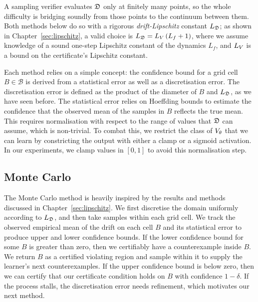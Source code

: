 A sampling verifier evaluates $\mathfrak{D}$ only at finitely many points, so the
whole difficulty is bridging soundly from those points to the continuum between
them. Both methods below do so with a rigorous \emph{drift-Lipschitz} constant
$L_{\mathfrak{D}}$; as shown in Chapter~\ref{sec:lipschitz}, a valid choice is
$L_{\mathfrak{D}} = L_{V}\,(L_f+1)$, where we assume knowledge of a sound one-step Lipschitz constant of the dynamics $L_f$, and $L_{V}$ is a bound on the certificate's Lipschitz constant.

Each method relies on a simple concept: the confidence bound for a grid cell $B \in \mathcal{B}$ is derived from a statistical error as well as a discretisation error. The discretisation error is defined as the product of the diameter of $B$ and $L_{\mathfrak{D}}$, as we have seen before. The statistical error relies on Hoeffding bounds to estimate the confidence that the observed mean of the samples in $B$ reflects the true mean. This requires normalisation with respect to the range of values that $\mathfrak{D}$ can assume, which is non-trivial. To combat this, we restrict the class of $V_\theta$ that we can learn by constricting the output with either a clamp or a sigmoid activation. In our experiments, we clamp values in $[0,1]$ to avoid this normalisation step.

\subsection{Monte Carlo}
\label{sec:mc}

The Monte Carlo method is heavily inspired by the results and methods discussed in Chapter~\ref{sec:lipschitz}. We first discretise the domain uniformly according to $L_{\mathfrak{D}}$, and then take samples within each grid cell. We track the observed empirical mean of the drift on each cell $B$ and its statistical error to produce upper and lower confidence bounds. If the lower confidence bound for some $B$ is greater than zero, then we certifiably have a counterexample inside $B$. We return $B$ as a certified violating region and sample within it to supply the learner's next counterexamples. If the upper confidence bound is below zero, then we can certify that our certificate condition holds on $B$ with confidence $1-\delta$. If the process stalls, the discretisation error needs refinement, which motivates our next method.



